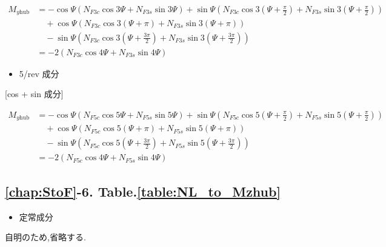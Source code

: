     \begin{align}
    M_{y\mathrm{hub}}
    &= -\cos\Psi
    \left(
    N_{F3c}\cos 3\Psi + N_{F3s}\sin 3\Psi
    \right)
    + \sin\Psi
    \left(
    N_{F3c}\cos 3\left(\Psi + \frac{\pi}{2}\right)
    + N_{F3s}\sin 3\left(\Psi + \frac{\pi}{2}\right)
    \right) \nonumber \\
    &\quad
    + \cos\Psi
    \left(
    N_{F3c}\cos 3(\Psi + \pi) + N_{F3s}\sin 3(\Psi + \pi)
    \right)  \nonumber \\
    &\quad
    - \sin\Psi
    \left(
    N_{F3c}\cos 3\left(\Psi + \frac{3\pi}{2}\right)
    + N_{F3s}\sin 3\left(\Psi + \frac{3\pi}{2}\right)
    \right) \nonumber \\
    &= -2\left(
    N_{F3c}\cos 4\Psi + N_{F3s}\sin 4\Psi
    \right)
    \end{align}

    \begin{itemize}
    \item 5/rev 成分
    \end{itemize}

    [cos + sin 成分]

    \begin{align}
    M_{y\mathrm{hub}}
    &= -\cos\Psi
    \left(
    N_{F5c}\cos 5\Psi + N_{F5s}\sin 5\Psi
    \right)
    + \sin\Psi
    \left(
    N_{F5c}\cos 5\left(\Psi + \frac{\pi}{2}\right)
    + N_{F5s}\sin 5\left(\Psi + \frac{\pi}{2}\right)
    \right) \nonumber \\
    &\quad
    + \cos\Psi
    \left(
    N_{F5c}\cos 5(\Psi + \pi) + N_{F5s}\sin 5(\Psi + \pi)
    \right)  \nonumber \\
    &\quad
    - \sin\Psi
    \left(
    N_{F5c}\cos 5\left(\Psi + \frac{3\pi}{2}\right)
    + N_{F5s}\sin 5\left(\Psi + \frac{3\pi}{2}\right)
    \right) \nonumber \\
    &= -2\left(
    N_{F5c}\cos 4\Psi + N_{F5s}\sin 4\Psi
    \right)
    \end{align}

    \subsection*{\ref{chap:StoF}-6. Table.\ref{table:NL_to_Mzhub}}

    \begin{itemize}
    \item 定常成分
    \end{itemize}

    自明のため,省略する.

